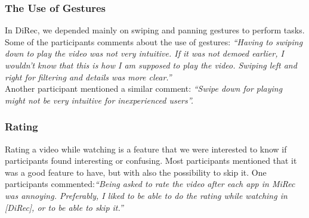 \subsubsection{The Use of Gestures}
In DiRec, we depended mainly on swiping and panning gestures to perform tasks.
Some of the participants comments about the use of gestures: \textit{``Having to
swiping down to play the video was not very intuitive. If it was not demoed earlier, I wouldn't know that this is how I am supposed to play the
video. Swiping left and right for filtering and details was more clear.''}\\
Another participant mentioned a similar comment: \textit{``Swipe down for
playing might not be very intuitive for inexperienced users''.}
\subsubsection{Rating}
Rating a video while watching is a feature that we were interested to
know if participants found interesting or confusing. Most participants
mentioned that it was a good feature to have, but with also the
possibility to skip it. One participants commented:\textit{``Being asked to rate the video after each app in MiRec was
annoying. Preferably, I liked to be able to do the rating while watching in
[DiRec], or to be able to skip it.''}\\

